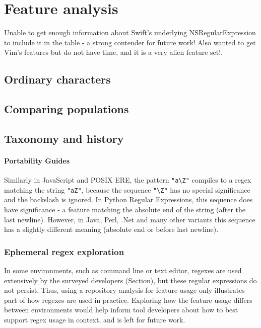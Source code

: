 \section{Feature analysis}

Unable to get enough information about Swift's underlying NSRegularExpression to include it in the table - a strong contender for future work!  Also wanted to get Vim's features but do not have time, and it is a very alien feature set!.

\subsection{Ordinary characters}

\subsection{Comparing populations}

\subsection{Taxonomy and history}

\paragraph{Portability Guides}
Similarly in JavaScript and POSIX ERE, the pattern \verb!"a\Z"! compiles to a regex matching the string \verb!"aZ"!, because the sequence \verb!"\Z"! has no special significance and the backslash is ignored.  In Python Regular Expressions, this sequence does have significance - a feature matching the absolute end of the string (after the last newline).  However, in Java, Perl, .Net and many other variants this sequence has a slightly different meaning (absolute end or before last newline).

\subsubsection{Ephemeral regex exploration}
In some environments, such as command line or text editor, regexes are used extensively by the surveyed developers (Section), but these regular expressions do not persist. Thus, using a repository analysis for feature usage only illustrates part of how regexes are used in practice. Exploring how the feature usage differs between environments would help inform tool developers about how to best support regex usage in context, and is left for future work.

